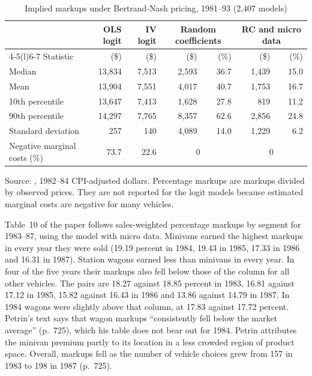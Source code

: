 \begin{table}[htbp]
\centering
\caption{Implied markups under Bertrand-Nash pricing, 1981--93 (2,407 models)}\label{tab:10-petrin-markups}
\small
\begin{tabular}{@{}lrrrrrr@{}}
\toprule
 & OLS logit & IV logit & \multicolumn{2}{c}{Random coefficients} & \multicolumn{2}{c}{RC and micro data} \\
\cmidrule(lr){4-5}\cmidrule(l){6-7}
Statistic & (\$) & (\$) & (\$) & (\%) & (\$) & (\%) \\
\midrule
Median              & 13,834 & 7,513 & 2,593 & 36.7 & 1,439 & 15.0 \\
Mean                & 13,904 & 7,551 & 4,017 & 40.7 & 1,753 & 16.7 \\
10th percentile     & 13,647 & 7,413 & 1,628 & 27.8 & 819   & 11.2 \\
90th percentile     & 14,297 & 7,765 & 8,357 & 62.6 & 2,856 & 24.8 \\
Standard deviation  & 257    & 140   & 4,089 & 14.0 & 1,229 & 6.2 \\
Negative marginal costs (\%) & 73.7 & 22.6 & \multicolumn{2}{c}{0} & \multicolumn{2}{c}{0} \\
\bottomrule
\end{tabular}

\smallskip
\begin{minipage}{0.92\textwidth}
\footnotesize Source: \citet[Table~9]{Petrin2002}, 1982--84 CPI-adjusted dollars. Percentage markups are markups
divided by observed prices. They are not reported for the logit models because estimated marginal costs are negative
for many vehicles.
\end{minipage}
\end{table}

Table~10 of the paper follows sales-weighted percentage markups by segment for 1983--87, using the model with micro
data. Minivans earned the highest markups in every year they were sold (19.19 percent in 1984, 19.43 in 1985, 17.33
in 1986 and 16.31 in 1987). Station wagons earned less than minivans in every year. In four of the five years their
markups also fell below those of the column for all other vehicles. The pairs are 18.27 against 18.85 percent in 1983,
16.81 against 17.12 in 1985, 15.82 against 16.43 in 1986 and 13.86 against 14.79 in 1987. In 1984 wagons were slightly
above that column, at 17.83 against 17.72 percent. Petrin's text says that wagon markups ``consistently fell below the
market average'' (p.~725), which his table does not bear out for 1984.
Petrin attributes the minivan premium partly to its location in a less crowded region of product space. Overall,
markups fell as the number of vehicle choices grew from 157 in 1983 to 198 in 1987 (p.~725).

